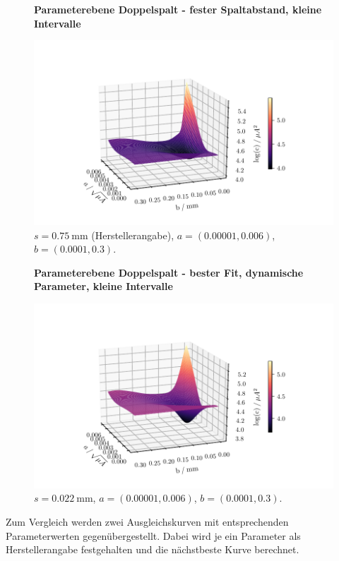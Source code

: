 \begin{figure}
    \centering
    \textbf{Parameterebene Doppelspalt - fester Spaltabstand, kleine Intervalle}\par\medskip
    \includegraphics[width=.9\textwidth]{python/leastSquaresDoppel3ss.pdf}
    \caption{$s = \SI{0.75}{\milli\meter}$ (Herstellerangabe), $a = (0.00001, 0.006)$, $b = (0.0001, 0.3)$.}
    \label{fig:lsd3ss}
\end{figure}
\begin{figure}
    \centering
    \textbf{Parameterebene Doppelspalt - bester Fit, dynamische Parameter, kleine Intervalle}\par\medskip
    \includegraphics[width=.9\textwidth]{python/leastSquaresDoppel3s.pdf}
    \caption{$s = \SI{0.022}{\milli\meter}$, $a = (0.00001, 0.006)$, $b = (0.0001, 0.3)$.}
    \label{fig:lsd3s}
\end{figure}

Zum Vergleich werden zwei Ausgleichskurven mit entsprechenden Parameterwerten gegenübergestellt. Dabei wird je ein Parameter als Herstellerangabe
festgehalten und die nächstbeste Kurve berechnet.

